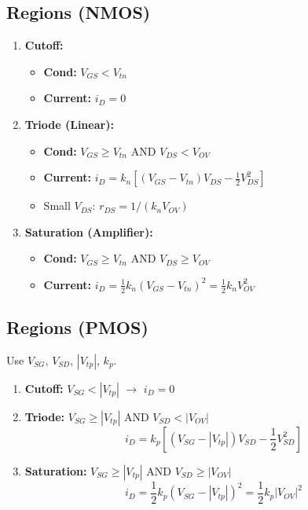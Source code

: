 \documentclass[10pt]{article}
\begin{document}
\begin{multicols*}{2}
\subsection*{Regions (NMOS)}
\begin{enumerate}\itemsep0pt
    \item \textbf{Cutoff:}
    \begin{itemize}\itemsep0pt
        \item \textbf{Cond:} $V_{GS} < V_{tn}$
        \item \textbf{Current:} $i_D = 0$
    \end{itemize}
    
    \item \textbf{Triode (Linear):}
    \begin{itemize}\itemsep0pt
        \item \textbf{Cond:} $V_{GS} \ge V_{tn}$ AND $V_{DS} < V_{OV}$
        \item \textbf{Current:} $i_D = k_n \left[ (V_{GS} - V_{tn})V_{DS} - \frac{1}{2}V_{DS}^2 \right]$
        \item Small $V_{DS}$: $r_{DS} = 1 / (k_n V_{OV})$
    \end{itemize}
    
    \item \textbf{Saturation (Amplifier):}
    \begin{itemize}\itemsep0pt
        \item \textbf{Cond:} $V_{GS} \ge V_{tn}$ AND $V_{DS} \ge V_{OV}$
        \item \textbf{Current:} $i_D = \frac{1}{2} k_n (V_{GS} - V_{tn})^2 = \frac{1}{2} k_n V_{OV}^2$
    \end{itemize}
\end{enumerate}

\subsection*{Regions (PMOS)}
Use $V_{SG}$, $V_{SD}$, $|V_{tp}|$, $k_p$.
\begin{enumerate}\itemsep0pt
    \item \textbf{Cutoff:} $V_{SG} < |V_{tp}|$ $\rightarrow$ $i_D = 0$
    \item \textbf{Triode:} $V_{SG} \ge |V_{tp}|$ AND $V_{SD} < |V_{OV}|$
    \[ i_D = k_p \left[ (V_{SG} - |V_{tp}|)V_{SD} - \frac{1}{2}V_{SD}^2 \right] \]
    \item \textbf{Saturation:} $V_{SG} \ge |V_{tp}|$ AND $V_{SD} \ge |V_{OV}|$
    \[ i_D = \frac{1}{2} k_p (V_{SG} - |V_{tp}|)^2 = \frac{1}{2} k_p |V_{OV}|^2 \]
\end{enumerate}


\end{multicols*}
\end{document}
